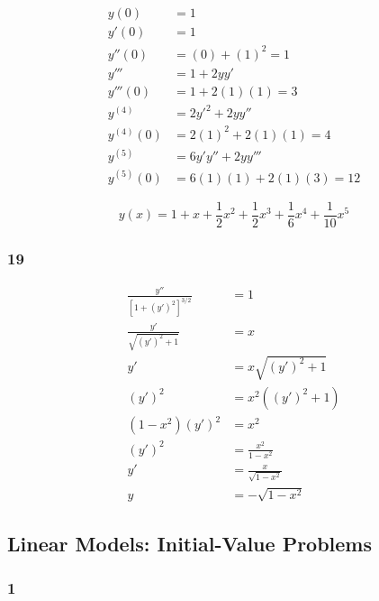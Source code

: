 \documentclass{article}
\begin{document}
\begin{align*}
  y(0)       & = 1                          \\
  y'(0)      & = 1                          \\
  y''(0)     & = (0) + (1)^2 = 1            \\
  y'''       & = 1 + 2 y y'                 \\
  y'''(0)    & = 1 + 2 (1) (1) = 3          \\
  y^{(4)}    & = 2 y'^2 + 2 y y''           \\
  y^{(4)}(0) & = 2 (1)^2 + 2 (1) (1) = 4    \\
  y^{(5)}    & = 6 y' y'' + 2 y y'''        \\
  y^{(5)}(0) & = 6 (1) (1) + 2 (1) (3) = 12
\end{align*}

\[y(x) = 1 + x + \frac{1}{2} x^2 + \frac{1}{2} x^3 + \frac{1}{6} x^4 + \frac{1}{10} x^5\]

\subsubsection{19}

\begin{align*}
  \frac{y''}{[1 + (y')^2]^{3 / 2}} & = 1                        \\
  \frac{y'}{\sqrt{(y')^2 + 1}}     & = x                        \\
  y'                               & = x \sqrt{(y')^2 + 1}      \\
  (y')^2                           & = x^2 ((y')^2 + 1)         \\
  (1 - x^2) (y')^2                 & = x^2                      \\
  (y')^2                           & = \frac{x^2}{1 - x^2}      \\
  y'                               & = \frac{x}{\sqrt{1 - x^2}} \\
  y                                & = -\sqrt{1 - x^2}
\end{align*}

\subsection{Linear Models: Initial-Value Problems}

\subsubsection{1}
\end{document}
